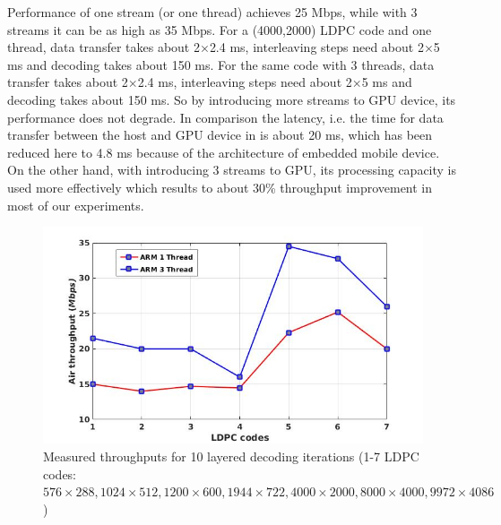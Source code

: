 \documentclass{article}
\begin{document}
Performance of one stream (or one thread) achieves 25 Mbps, while with 3 streams it can be as high as 35 Mbps. For a (4000,2000) LDPC code and one thread, data transfer takes about 2$\times$2.4 ms, interleaving steps need about 2$\times$5 ms and decoding takes about 150 ms. For the same code with 3 threads, data transfer takes about 2$\times$2.4 ms, interleaving steps need about 2$\times$5 ms and decoding takes about 150 ms. So by introducing more streams to GPU device, its performance does not degrade. In comparison the latency, i.e. the time for data transfer between the host and GPU device in \cite{art_gpu_0} is about 20 ms, which has been reduced here to 4.8 ms because of the architecture of embedded mobile device. On the other hand, with introducing 3 streams to GPU, its processing capacity is used more effectively which results to about 30\% throughput improvement in most of our experiments.

\begin{figure}[H]
\begin{centering}
\includegraphics[scale=0.43]{air.jpg}
\caption[width=.5\textwidth]{Measured throughputs for 10 layered decoding iterations (1-7 LDPC codes: $576 \times 288, 1024 \times 512, 1200 \times 600, 1944 \times 722, 4000 \times 2000, 8000 \times 4000, 9972 \times 4086$)}\label{fig::air}
\end{centering}
\end{figure}
\end{document}
